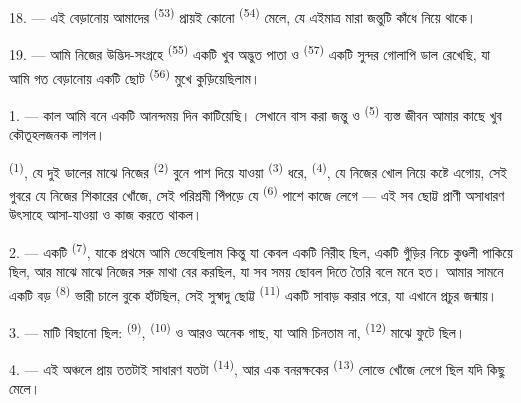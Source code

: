 18. --- এই বেড়ানোয় আমাদের  \textsuperscript{(53)}
প্রায়ই কোনো  \textsuperscript{(54)} মেলে, যে এইমাত্র মারা
জন্তুটি কাঁধে নিয়ে থাকে।

19. --- আমি নিজের উদ্ভিদ-সংগ্রহে  \textsuperscript{(55)} একটি খুব
অদ্ভুত পাতা ও  \textsuperscript{(57)} একটি সুন্দর গোলাপি ডাল
রেখেছি, যা আমি গত বেড়ানোয় একটি ছোট  \textsuperscript{(56)} মুখে
কুড়িয়েছিলাম।

\VUsaut{3.0mm}
\VUsaut{3.0mm}

\VUsaut{3.0mm}

1. --- কাল আমি বনে একটি আনন্দময় দিন কাটিয়েছি। সেখানে বাস করা জন্তু ও
 \textsuperscript{(5)} ব্যস্ত জীবন আমার কাছে খুব
কৌতূহলজনক লাগল।

 \textsuperscript{(1)}, যে দুই ডালের মাঝে নিজের 
\textsuperscript{(2)} বুনে পাশ দিয়ে যাওয়া  \textsuperscript{(3)}
ধরে,  \textsuperscript{(4)}, যে নিজের খোল নিয়ে কষ্টে এগোয়, সেই
গুবরে যে নিজের শিকারের খোঁজে, সেই পরিশ্রমী পিঁপড়ে যে 
\textsuperscript{(6)} পাশে কাজে লেগে --- এই সব ছোট্ট প্রাণী অসাধারণ উৎসাহে
আসা-যাওয়া ও কাজ করতে থাকল।

2. --- একটি  \textsuperscript{(7)}, যাকে প্রথমে আমি 
ভেবেছিলাম কিন্তু যা কেবল একটি নিরীহ  ছিল, একটি গুঁড়ির নিচে
কুণ্ডলী পাকিয়ে ছিল, আর মাঝে মাঝে নিজের সরু মাথা বের করছিল, যা সব সময় ছোবল
দিতে তৈরি বলে মনে হত। আমার সামনে একটি বড় 
\textsuperscript{(8)} ভারী চালে বুকে হাঁটছিল, সেই সুস্বাদু ছোট্ট  \textsuperscript{(11)} একটি সাবাড় করার পরে, যা এখানে প্রচুর জন্মায়।

3. --- মাটি  বিছানো ছিল: 
\textsuperscript{(9)},  \textsuperscript{(10)} ও আরও অনেক গাছ,
যা আমি চিনতাম না,  \textsuperscript{(12)} মাঝে ফুটে ছিল।

4. --- এই অঞ্চলে  প্রায় ততটাই সাধারণ যতটা 
\textsuperscript{(14)}, আর এক বনরক্ষকের  \textsuperscript{(13)}
লোভে খোঁজে লেগে ছিল যদি কিছু মেলে।

\VUsaut{3.0mm}
\VUsaut{3.0mm}

